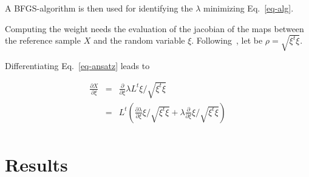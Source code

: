 \documentclass[aip,pof,nofootinbib,reprint,onecolumn]{revtex4-1}
\newcommand{\mypar}[1]{\left(#1\right)}
\newcommand{\rpoint}{X}
\begin{document}
A BFGS-algorithm is then used for identifying the $\lambda$ minimizing Eq.~\eqref{eq-alg}.

Computing the weight needs the evaluation of the jacobian of the maps between the reference sample $\rpoint$ and the random variable $\xi$.
Following~\citep{Morzfeld2012}, let be $\rho = \sqrt{\xi^t \xi}$.

Differentiating Eq.~\eqref{eq-ansatz} leads to

\begin{equation}
\begin{array}{lll}
\frac{\partial \rpoint}{\partial \xi} &=& \frac{\partial}{\partial \xi} \lambda L^t \xi/\sqrt{\xi^t \xi}\\
 &=& L^t \mypar{\frac{\partial\lambda}{\partial \xi} \xi/\sqrt{\xi^t \xi} + \lambda \frac{\partial}{\partial \xi} \xi/\sqrt{\xi^t \xi} }\\
\end{array}
\end{equation}



%
\section{Results}
\label{sec-results}
\end{document}
